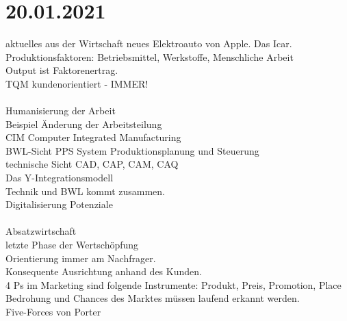 \documentclass{article}
\begin{document}
	\section*{20.01.2021}
	aktuelles aus der Wirtschaft neues Elektroauto von Apple. Das Icar. \\
	Produktionsfaktoren: Betriebsmittel, Werkstoffe, Menschliche Arbeit \\
	Output ist Faktorenertrag. \\
	TQM kundenorientiert - IMMER! \\
	\\
	Humanisierung der Arbeit \\
	Beispiel Änderung der Arbeitsteilung \\
	CIM Computer Integrated Manufacturing \\
	BWL-Sicht PPS System Produktionsplanung und Steuerung \\
	technische Sicht CAD, CAP, CAM, CAQ \\
	Das Y-Integrationsmodell \\
	Technik und BWL kommt zusammen. \\
	Digitalisierung Potenziale \\
	\\
	Absatzwirtschaft \\
	letzte Phase der Wertschöpfung \\
	Orientierung immer am Nachfrager. \\
	Konsequente Ausrichtung anhand des Kunden. \\
	4 Ps im Marketing sind folgende Instrumente: Produkt, Preis, Promotion, Place \\
	Bedrohung und Chances des Marktes müssen laufend erkannt werden. \\
	Five-Forces von Porter \\
\end{document}
